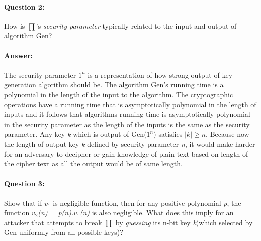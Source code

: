 \documentclass{article}
\begin{document}
    \paragraph{Question 2:} How is $\prod$'s \emph{security parameter} typically related to the input and output of algorithm Gen?
    
    \paragraph{Answer: \newline}
        The security parameter $1^n$ is a representation of how strong output of key generation algorithm should be. The algorithm Gen's running time is a polynomial in the length of the input to the algorithm. The cryptographic operations have a running time that is asymptotically polynomial in the length of inputs and it follows that algorithms running time is asymptotically polynomial in the security parameter as the length of the inputs is the same as the security parameter. \newline
        Any key \emph{k} which is output of Gen($1^n$) satisfies $|k|\geq n$. Because now the length of output key \emph{k} defined by security parameter \emph{n}, it would make harder for an adversary to decipher or gain knowledge of plain text based on length of the cipher text as all the output would be of same length.
    
    \paragraph{Question 3:} Show that if \emph{$v_1$} is negligible function, then for any positive polynomial \emph{p}, the function \emph{$v_2$(n) = p(n).$v_1$(n)} is also negligible. What does this imply for an attacker that attempts to break $\prod$ by \emph{guessing} its n-bit key \emph{k}(which selected by Gen uniformly from all possible keys)?
    
\end{document}
